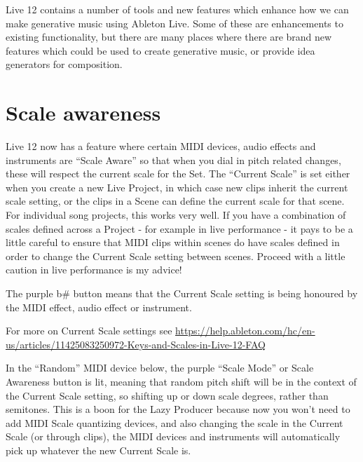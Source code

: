 \documentclass[
  12pt,
  letterpaper,
  oneside,
  open=any]{scrbook}
\makeatletter
\newcommand*\pandocbounded[1]{%
  \sbox\pandoc@box{#1}%
  \Gscale@div\@tempa{\textheight}{\dimexpr\ht\pandoc@box+\dp\pandoc@box\relax}%
  \Gscale@div\@tempb{\linewidth}{\wd\pandoc@box}%
  \ifdim\@tempb\p@<\@tempa\p@\let\@tempa\@tempb\fi%
  \ifdim\@tempa\p@<\p@\scalebox{\@tempa}{\usebox\pandoc@box}%
  \else\usebox{\pandoc@box}%
  \fi%
}
\makeatother
\begin{document}
\begin{tcolorbox}[enhanced jigsaw, titlerule=0mm, toprule=.15mm, bottomrule=.15mm, colframe=quarto-callout-tip-color-frame, bottomtitle=1mm, opacityback=0, breakable, leftrule=.75mm, coltitle=black, colback=white, rightrule=.15mm, arc=.35mm, toptitle=1mm, title=\textcolor{quarto-callout-tip-color}{\faLightbulb}\hspace{0.5em}{Key idea}, opacitybacktitle=0.6, left=2mm, colbacktitle=quarto-callout-tip-color!10!white]

Live 12 contains a number of tools and new features which enhance how we
can make generative music using Ableton Live. Some of these are
enhancements to existing functionality, but there are many places where
there are brand new features which could be used to create generative
music, or provide idea generators for composition.

\end{tcolorbox}

\section{Scale awareness}\label{scale-awareness}

Live 12 now has a feature where certain MIDI devices, audio effects and
instruments are ``Scale Aware'' so that when you dial in pitch related
changes, these will respect the current scale for the Set. The ``Current
Scale'' is set either when you create a new Live Project, in which case
new clips inherit the current scale setting, or the clips in a Scene can
define the current scale for that scene. For individual song projects,
this works very well. If you have a combination of scales defined across
a Project - for example in live performance - it pays to be a little
careful to ensure that MIDI clips within scenes do have scales defined
in order to change the Current Scale setting between scenes. Proceed
with a little caution in live performance is my advice!

The purple b\# button means that the Current Scale setting is being
honoured by the MIDI effect, audio effect or instrument.

\pandocbounded{\texttt{[image: images/Live12\_Scale.png]}}

For more on Current Scale settings see
\url{https://help.ableton.com/hc/en-us/articles/11425083250972-Keys-and-Scales-in-Live-12-FAQ}

In the ``Random'' MIDI device below, the purple ``Scale Mode'' or Scale
Awareness button is lit, meaning that random pitch shift will be in the
context of the Current Scale setting, so shifting up or down scale
degrees, rather than semitones. This is a boon for the Lazy Producer
because now you won't need to add MIDI Scale quantizing devices, and
also changing the scale in the Current Scale (or through clips), the
MIDI devices and instruments will automatically pick up whatever the new
Current Scale is.
\end{document}
